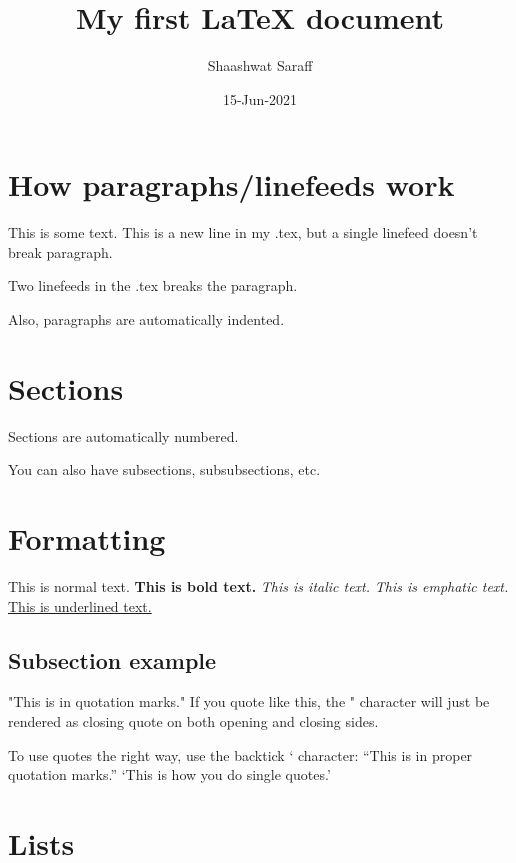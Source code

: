 \documentclass{article}
\author{Shaashwat Saraff}
\title{My first {\LaTeX} document}
\date{15-Jun-2021}
\begin{document}
  \maketitle


  \section{How paragraphs/linefeeds work}

    This is some text.
    This is a new line in my .tex, but a single linefeed doesn't break paragraph.

    Two linefeeds in the .tex breaks the paragraph.

    Also, paragraphs are automatically indented. 


  \section{Sections}

    Sections are automatically numbered.

    You can also have subsections, subsubsections, etc.


  \section{Formatting}

    This is normal text. 
    \textbf{This is bold text.} 
    \textit{This is italic text.} 
    \emph{This is emphatic text.} 
    \underline{This is underlined text.}


    \subsection{Subsection example}

      "This is in quotation marks." If you quote like this, the " character will just be rendered as closing quote on both opening and closing sides. 

      To use quotes the right way, use the backtick ` character:
      ``This is in proper quotation marks.'' `This is how you do single quotes.'


  \section{Lists}
\end{document}
